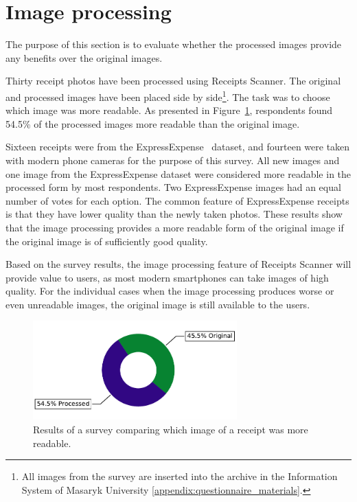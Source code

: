 \documentclass[
  digital, %
  table,   %
  oneside, %
  lof,     %
  lot,     %
]{fithesis3}
\begin{document}
\section{Image processing}
The purpose of this section is to evaluate whether the processed images provide any benefits over the original images.

Thirty receipt photos have been processed using Receipts Scanner. The original and processed images have been placed side by side\footnote{All images from the survey are inserted into the archive in the Information System of Masaryk University \ref{appendix:questionnaire_materials}.}. The task was to choose which image was more readable. As presented in Figure~\ref{fig:which_image_is_more_readable}, respondents found 54.5\% of the processed images more readable than the original image.

Sixteen receipts were from the ExpressExpense~\cite{ExpressExpense2019Receipt} dataset, and fourteen were taken with modern phone cameras for the purpose of this survey.
All new images and one image from the ExpressExpense dataset were considered more readable in the processed form by most respondents. Two ExpressExpense images had an equal number of votes for each option. The common feature of ExpressExpense receipts is that they have lower quality than the newly taken photos. These results show that the image processing provides a more readable form of the original image if the original image is of sufficiently good quality.

Based on the survey results, the image processing feature of Receipts Scanner will provide value to users, as most modern smartphones can take images of high quality. For the individual cases when the image processing produces worse or even unreadable images, the original image is still available to the users.

\begin{figure}
    \begin{center}
        \includegraphics[width=0.7\textwidth]{figures/graphs/which_image_is_more_readable}
    \end{center}
    \caption{Results of a survey comparing which image of a receipt was more readable.}
    \label{fig:which_image_is_more_readable}
\end{figure}
\end{document}
